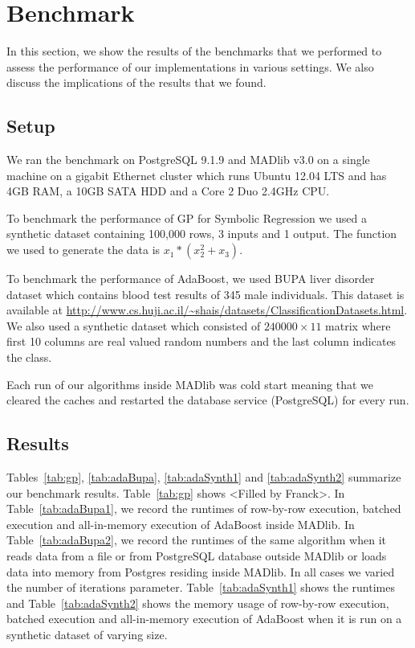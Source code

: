 
\section{Benchmark}
\label{sec:bench}
In this section, we show the results of the benchmarks that we performed to assess the performance of our implementations in various settings. We also discuss the implications of the results that we found.
\subsection{Setup}
We ran the benchmark on PostgreSQL 9.1.9 and MADlib v3.0 on a single machine on a gigabit Ethernet cluster which runs Ubuntu 12.04 LTS and has 4GB RAM, a 10GB SATA HDD and a Core 2 Duo 2.4GHz CPU. 

To benchmark the performance of GP for Symbolic Regression we used a synthetic dataset containing 100,000 rows, 3 inputs and 1 output. The function we used to generate the data is $x_1*(x_2^2+x_3)$.

To benchmark the performance of AdaBoost, we used BUPA liver disorder dataset which contains blood test results of 345 male individuals. This dataset is available at \url{http://www.cs.huji.ac.il/~shais/datasets/ClassificationDatasets.html}. We also used a synthetic dataset which consisted of $240000\times11$ matrix where first 10 columns are real valued random numbers and the last column indicates the class.

Each run of our algorithms inside MADlib was cold start meaning that we cleared the caches and restarted the database service (PostgreSQL) for every run.
\subsection{Results}
Tables~\ref{tab:gp}, \ref{tab:adaBupa}, \ref{tab:adaSynth1} and \ref{tab:adaSynth2} summarize our benchmark results. Table~\ref{tab:gp} shows <Filled by Franck>. In Table~\ref{tab:adaBupa1}, we record the runtimes of row-by-row execution, batched execution and all-in-memory execution of AdaBoost inside MADlib. In Table~\ref{tab:adaBupa2}, we record the runtimes of the same algorithm when it reads data from a file or from PostgreSQL database outside MADlib or loads data into memory from Postgres residing inside MADlib. In all cases we varied the number of iterations parameter. Table~\ref{tab:adaSynth1} shows the runtimes and Table~\ref{tab:adaSynth2} shows the memory usage of row-by-row execution, batched execution and all-in-memory execution of AdaBoost when it is run on a synthetic dataset of varying size.   

